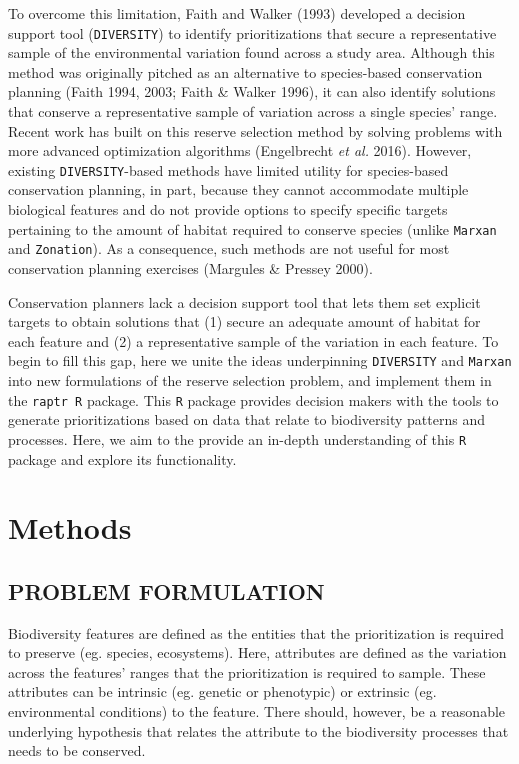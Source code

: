 To overcome this limitation, Faith and Walker (1993) developed a
decision support tool (\texttt{DIVERSITY}) to identify prioritizations
that secure a representative sample of the environmental variation found
across a study area. Although this method was originally pitched as an
alternative to species-based conservation planning (Faith 1994, 2003;
Faith \& Walker 1996), it can also identify solutions that conserve a
representative sample of variation across a single species' range.
Recent work has built on this reserve selection method by solving
problems with more advanced optimization algorithms (Engelbrecht
\emph{et al.} 2016). However, existing \texttt{DIVERSITY}-based methods
have limited utility for species-based conservation planning, in part,
because they cannot accommodate multiple biological features and do not
provide options to specify specific targets pertaining to the amount of
habitat required to conserve species (unlike \texttt{Marxan} and
\texttt{Zonation}). As a consequence, such methods are not useful for
most conservation planning exercises (Margules \& Pressey 2000).

Conservation planners lack a decision support tool that lets them set
explicit targets to obtain solutions that (1) secure an adequate amount
of habitat for each feature and (2) a representative sample of the
variation in each feature. To begin to fill this gap, here we unite the
ideas underpinning \texttt{DIVERSITY} and \texttt{Marxan} into new
formulations of the reserve selection problem, and implement them in the
\texttt{raptr R} package. This \texttt{R} package provides decision
makers with the tools to generate prioritizations based on data that
relate to biodiversity patterns and processes. Here, we aim to the
provide an in-depth understanding of this \texttt{R} package and explore
its functionality.

\section{Methods}\label{methods}

\subsection{PROBLEM FORMULATION}\label{problem-formulation}

Biodiversity features are defined as the entities that the
prioritization is required to preserve (eg. species, ecosystems). Here,
attributes are defined as the variation across the features' ranges that
the prioritization is required to sample. These attributes can be
intrinsic (eg. genetic or phenotypic) or extrinsic (eg. environmental
conditions) to the feature. There should, however, be a reasonable
underlying hypothesis that relates the attribute to the biodiversity
processes that needs to be conserved.

